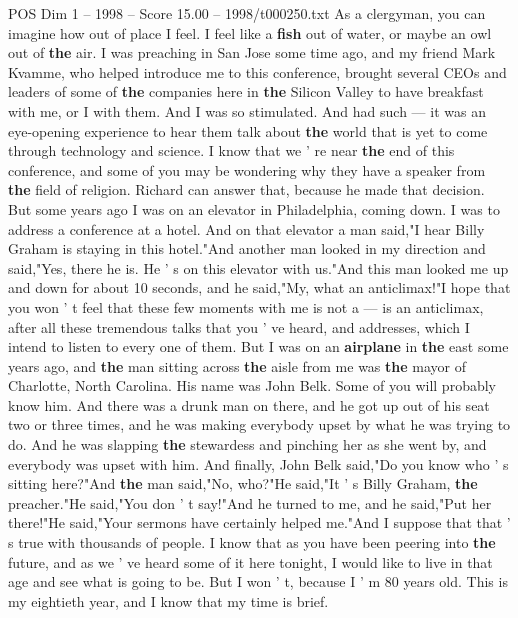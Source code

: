 \begin{textsample}{POS Dim 1 – 1998 – Score 15.00 – 1998/t000250.txt}  \label{ex:f1_pos_016}
As a clergyman, you can imagine how out of place I feel.
I feel like a \textbf{fish} out of water, or maybe an owl out of \textbf{the} air.
I was preaching in San Jose some time ago, and my friend Mark Kvamme, who helped introduce me to this conference, brought several CEOs and leaders of some of \textbf{the} companies here in \textbf{the} Silicon Valley to have breakfast with me, or I with them.
And I was so stimulated.
And had such — it was an eye-opening experience to hear them talk about \textbf{the} world that is yet to come through technology and science.
I know that we ' re near \textbf{the} end of this conference, and some of you may be wondering why they have a speaker from \textbf{the} field of religion.
Richard can answer that, because he made that decision.
But some years ago I was on an elevator in Philadelphia, coming down.
I was to address a conference at a hotel.
And on that elevator a man said,"I hear Billy Graham is staying in this hotel."And another man looked in my direction and said,"Yes, there he is.
He ' s on this elevator with us."And this man looked me up and down for about 10 seconds, and he said,"My, what an anticlimax!"I hope that you won ' t feel that these few moments with me is not a — is an anticlimax, after all these tremendous talks that you ' ve heard, and addresses, which I intend to listen to every one of them.
But I was on an \textbf{airplane} in \textbf{the} east some years ago, and \textbf{the} man sitting across \textbf{the} aisle from me was \textbf{the} mayor of Charlotte, North Carolina.
His name was John Belk.
Some of you will probably know him.
And there was a drunk man on there, and he got up out of his seat two or three times, and he was making everybody upset by what he was trying to do.
And he was slapping \textbf{the} stewardess and pinching her as she went by, and everybody was upset with him.
And finally, John Belk said,"Do you know who ' s sitting here?"And \textbf{the} man said,"No, who?"He said,"It ' s Billy Graham, \textbf{the} preacher."He said,"You don ' t say!"And he turned to me, and he said,"Put her there!"He said,"Your sermons have certainly helped me."And I suppose that that ' s true with thousands of people.
I know that as you have been peering into \textbf{the} future, and as we ' ve heard some of it here tonight, I would like to live in that age and see what is going to be.
But I won ' t, because I ' m 80 years old.
This is my eightieth year, and I know that my time is brief.

\end{textsample}
